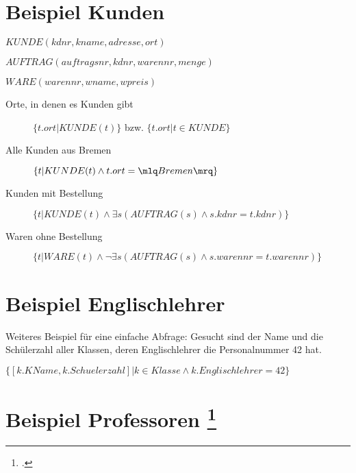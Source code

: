 \documentclass{lehramt-informatik}
\begin{document}
%

\section{Beispiel Kunden}

\begin{mdframed}
\noindent
$KUNDE (kdnr, kname, adresse, ort)$

\noindent
$AUFTRAG (auftragsnr, kdnr, warennr, menge)$

\noindent
$WARE (warennr, wname, wpreis)$
\end{mdframed}

\begin{description}
\item[Orte, in denen es Kunden gibt]
$\{t.ort | KUNDE(t)\}$ bzw. $\{t.ort | t \in KUNDE \}$

\item[Alle Kunden aus Bremen]
$\{t | KUNDE(t) \land t.ort=\mlq Bremen \mrq \}$

\item[Kunden mit Bestellung]
$\{t | KUNDE(t) \land \exists s(AUFTRAG(s) \land s.kdnr=t.kdnr)\}$

\item[Waren ohne Bestellung]
$\{t | WARE(t) \land \neg\exists s(AUFTRAG(s) \land s.warennr=t.warennr)\}$
\end{description}

\section{Beispiel Englischlehrer}

Weiteres Beispiel für eine einfache Abfrage: Gesucht sind der Name
und die Schülerzahl aller Klassen, deren Englischlehrer die
Personalnummer 42 hat.

$\{[k.KName, k.Schuelerzahl] | k \in Klasse \land k.Englischlehrer = 42\}$

%

\section{Beispiel Professoren
\footcite{net:html:uni-osnabrueck:dbs-skript}}
\end{document}
